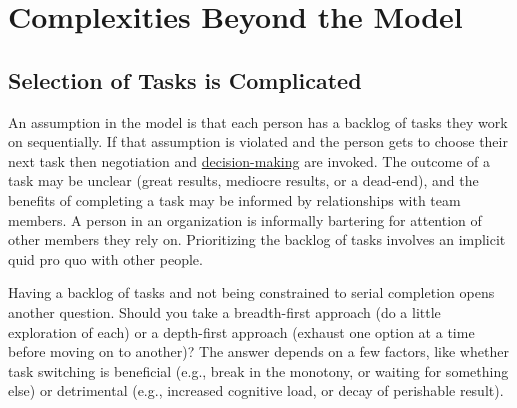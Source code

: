 





\section{Complexities Beyond the Model}

\subsection*{Selection of Tasks is Complicated}

An assumption in the model is that each person has a backlog of tasks they work on sequentially. If that assumption is violated and the person gets to choose their next task then negotiation and 
\href{https://en.wikipedia.org/wiki/Decision-making}{decision-making}
are invoked. The outcome of a task may be unclear (great results, mediocre results, or a dead-end), and the benefits of completing a task may be informed by relationships with team members. A person in an organization is informally bartering for attention of other members they rely on. Prioritizing the backlog of tasks involves an implicit quid pro quo with other people. 

Having a backlog of tasks and not being constrained to serial completion opens another question. Should you take a breadth-first approach (do a little exploration of each) or a depth-first approach (exhaust one option at a time before moving on to another)? The answer depends on a few factors, like whether task switching is beneficial (e.g., break in the monotony, or waiting for something else) or detrimental (e.g., increased cognitive load, or decay of perishable result). 

